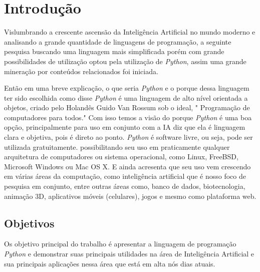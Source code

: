 \chapter*{Introdução}

Vislumbrando a crescente ascensão da Inteligência Artificial no mundo moderno e analisando a grande quantidade de linguagens de programação, a seguinte pesquisa buscando uma linguagem mais simplificada porém com grande possibilidades de utilização optou pela utilização de \textit{Python}, assim uma grande mineração por conteúdos relacionados foi iniciada.

Então em uma breve explicação, o que seria \textit{Python} e o porque dessa linguagem ter sido escolhida como disse \cite{pythonbasico2024} \textit{Python} é uma linguagem de alto nível orientada a objetos, criado pelo Holandês Guido Van Rossum sob o ideal, " Programação de computadores para todos." Com isso temos a visão do porque \textit{Python} é uma boa opção, principalmente para uso em conjunto com a IA \cite{menezes2010introduccao} diz que ela é linguagem clara e objetiva, pois é direto ao ponto. \textit{Python} é software livre, ou seja, pode ser utilizada gratuitamente. possibilitando seu uso em praticamente qualquer arquitetura de computadores ou sistema operacional, como Linux, FreeBSD, Microsoft Windows ou Mac OS X.
E ainda acresenta que seu uso vem crescendo em várias áreas da computação, como inteligência artificial que é nosso foco de pesquisa em conjunto, entre outras áreas como, banco de dados, biotecnologia, animação 3D, aplicativos móveis (celulares), jogos e mesmo como plataforma web.


\newpage
\section{Objetivos}
Os objetivo principal do trabalho é apresentar a linguagem de programação \textit{Python} e demonstrar suas principais utilidades na área de Inteligência Artificial e sua principais aplicações nessa área que está em alta nós dias atuais.

